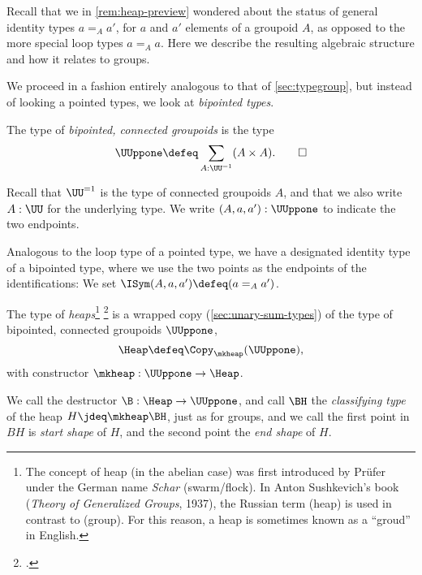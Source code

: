 Recall that we in \cref{rem:heap-preview} wondered about
the status of general identity types $a=_A a'$,
for $a$ and $a'$ elements of a groupoid $A$,
as opposed to the more special loop types $a=_Aa$.
Here we describe the resulting algebraic structure
and how it relates to groups.

We proceed in a fashion entirely analogous to that of \cref{sec:typegroup},
but instead of looking a pointed types, we look at \emph{bipointed types}.

\begin{definition}\label{def:bipt-conn-groupoid}
  The type of \emph{bipointed, connected groupoids} is the type
  \[
    \UUppone \defeq \sum_{A:\UU^{=1}}(A \times A).\qedhere
  \]
\end{definition}
Recall that $\UU^{=1}$ is the type of connected groupoids $A$,
and that we also write $A:\UU$ for the underlying type.
We write $(A,a,a'):\UUppone$ to indicate the two endpoints.

Analogous to the loop type of a pointed type,
we have a designated identity type of a bipointed type,
where we use the two points as the endpoints of the identifications:
We set $\ISym(A,a,a') \defeq (a =_A a')$.

\begin{definition}\label{def:heap}
  The type of \emph{heaps}\footnote{%
    The concept of heap (in the abelian case)
    was first introduced by Prüfer\footnotemark{}
    under the German name \emph{Schar} (swarm/flock).
    In Anton Sushkevich's book
    (\emph{Theory of Generalized Groups}, 1937),
    the Russian term  (heap)
    is used in contrast to  (group).
    For this reason, a heap is sometimes
    known as a ``groud'' in English.}%
  \footcitetext{Pruefer-AG}
  is a wrapped copy (\cf \cref{sec:unary-sum-types})
  of the type of bipointed, connected groupoids $\UUppone$,
  \[
    \Heap \defeq \Copy_{\mkheap}(\UUppone),
  \]
  with constructor $\mkheap : \UUppone \to \Heap$.
\end{definition}
We call the destructor $\B : \Heap \to \UUppone$,
and call $\BH$ the \emph{classifying type} of the heap $H \jdeq\mkheap\BH$,
just as for groups,
and we call the first point in $BH$ is \emph{start shape} of $H$,
and the second point the \emph{end shape} of $H$.

